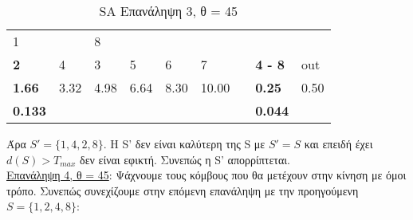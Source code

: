 \documentclass[12pt, a4paper]{article}
\begin{document}
\begin{table}[H]
\centering
\begin{tabular}{lllllllll}
\multicolumn{1}{|l}{1}              & \multicolumn{1}{l|}{\textbf{}} & 8                         &                           &                           &       &                                &                                     &      \\
\multicolumn{1}{|l|}{\textbf{2}}    & \multicolumn{1}{l|}{4}         & \multicolumn{1}{l|}{3}    & \multicolumn{1}{l|}{5}    & \multicolumn{1}{l|}{6}    & 7     & \multicolumn{1}{l|}{\textbf{}} & \multicolumn{1}{l|}{\textbf{4 - 8}} & out  \\ \cline{1-6} \cline{8-9} 
\multicolumn{1}{|l|}{\textbf{1.66}} & \multicolumn{1}{l|}{3.32}      & \multicolumn{1}{l|}{4.98} & \multicolumn{1}{l|}{6.64} & \multicolumn{1}{l|}{8.30} & 10.00 & \multicolumn{1}{l|}{\textbf{}} & \multicolumn{1}{l|}{\textbf{0.25}}  & 0.50 \\
\textbf{0.133}                      &                                &                           &                           &                           &       & \textbf{}                      & \textbf{0.044}                      &     
\end{tabular}
\caption{SA Επανάληψη 3, θ = 45}
\label{my-label}
\end{table}

Άρα \(S'=\{1,4,2,8\}\). Η S' δεν είναι καλύτερη της S με \(S'=S\) και επειδή έχει \(d(S) > T_{max}\) δεν είναι εφικτή.  Συνεπώς η S'  απορρίπτεται. \\


\underline{Επανάληψη 4, θ = 45}: Ψάχνουμε τους κόμβους που θα μετέχουν στην κίνηση με όμοι τρόπο. Συνεπώς συνεχίζουμε στην επόμενη επανάληψη με την προηγούμενη \(S = \{1,2,4,8\}\):
\end{document}
